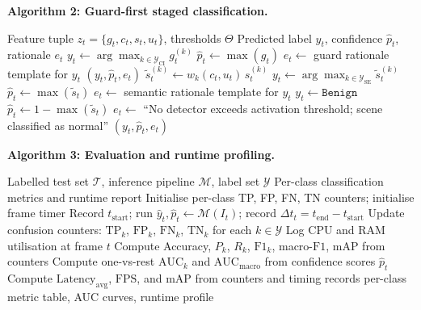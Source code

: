\documentclass[a4paper,fleqn]{cas-dc}
\begin{document}
\noindent\textbf{Algorithm 2: Guard-first staged classification.}
\begin{algorithm}[H]
\caption{Guard-First Stacked Classification}
\label{alg:stacked}
\begin{algorithmic}[1]
\Require Feature tuple $z_t = \{g_t, c_t, s_t, u_t\}$, thresholds $\Theta$
\Ensure Predicted label $y_t$, confidence $\hat{p}_t$, rationale $e_t$
    \State $y_t \leftarrow \arg\max_{k \in \mathcal{Y}_{\text{CI}}} g_t^{(k)}$
    \State $\hat{p}_t \leftarrow \max(g_t)$
    \State $e_t \leftarrow$ guard rationale template for $y_t$
    \State \Return $(y_t, \hat{p}_t, e_t)$
\EndIf
{}
    \State $\tilde{s}_t^{(k)} \leftarrow w_k(c_t, u_t)\, s_t^{(k)}$ 
\EndFor
{}
    \State $y_t \leftarrow \arg\max_{k \in \mathcal{Y}_{\text{SE}}} \tilde{s}_t^{(k)}$
    \State $\hat{p}_t \leftarrow \max(\tilde{s}_t)$
    \State $e_t \leftarrow$ semantic rationale template for $y_t$
\Else
    \State $y_t \leftarrow \texttt{Benign}$
    \State $\hat{p}_t \leftarrow 1 - \max(\tilde{s}_t)$
    \State $e_t \leftarrow$ ``No detector exceeds activation threshold; scene classified as normal''
\EndIf
\State \Return $(y_t, \hat{p}_t, e_t)$
\end{algorithmic}
\end{algorithm}
 
\noindent\textbf{Algorithm 3: Evaluation and runtime profiling.}
\begin{algorithm}[H]
\caption{Evaluation and Runtime Metrics Pipeline}
\label{alg:evaluate}
\begin{algorithmic}[1]
\Require Labelled test set $\mathcal{T}$, inference pipeline $\mathcal{M}$, label set $\mathcal{Y}$
\Ensure Per-class classification metrics and runtime report
\State Initialise per-class TP, FP, FN, TN counters; initialise frame timer
    \State Record $t_{\text{start}}$; run $\hat{y}_t, \hat{p}_t \leftarrow \mathcal{M}(I_t)$; record $\Delta t_t = t_{\text{end}} - t_{\text{start}}$
    \State Update confusion counters: $\mathrm{TP}_k$, $\mathrm{FP}_k$, $\mathrm{FN}_k$, $\mathrm{TN}_k$ for each $k \in \mathcal{Y}$
    \State Log CPU and RAM utilisation at frame $t$
\EndFor
\State Compute Accuracy, $P_k$, $R_k$, $\mathrm{F1}_k$, macro-$\mathrm{F1}$, mAP from counters
\State Compute one-vs-rest $\mathrm{AUC}_k$ and $\mathrm{AUC}_{\text{macro}}$ from confidence scores $\hat{p}_t$
\State Compute $\mathrm{Latency}_{\text{avg}}$, $\mathrm{FPS}$, and mAP from counters and timing records
\State \Return per-class metric table, AUC curves, runtime profile
\end{algorithmic}
\end{algorithm}
 
\end{document}
